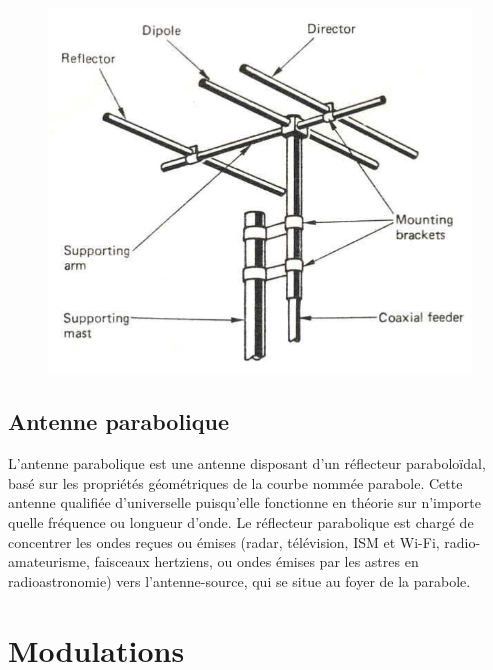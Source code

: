 \documentclass[12pt]{article}
\begin{document}
\begin{figure}[H]
\centering
\includegraphics[scale=0.3]{images/Yagi.png}
\end{figure}

\subsection{Antenne parabolique}

L'antenne parabolique est une antenne disposant d'un réflecteur paraboloïdal, basé sur les propriétés géométriques de la courbe nommée parabole. Cette antenne qualifiée d'universelle puisqu'elle fonctionne en théorie sur n'importe quelle fréquence ou longueur d'onde. Le réflecteur parabolique est chargé de concentrer les ondes reçues ou émises (radar, télévision, ISM et Wi-Fi, radio-amateurisme, faisceaux hertziens, ou ondes émises par les astres en radioastronomie) vers l'antenne-source, qui se situe au foyer de la parabole.

\section{Modulations}
\end{document}
